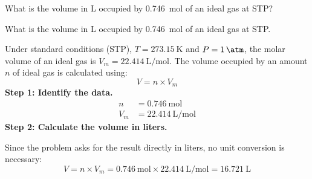 \begin{exercise}
    What is the volume in \unit{\liter} occupied by \qty{0.746}{\mol} of an ideal gas at STP?
    \begin{solu}
        What is the volume in \unit{\liter} occupied by \qty{0.746}{\mol} of an ideal gas at STP.


        Under standard conditions (STP), $T = \qty{273.15}{\kelvin}$ and $P = \qty{1}{\atm}$,
        the molar volume of an ideal gas is $V_m = \qty{22.414}{\liter\per\mol}$. The volume
        occupied by an amount $n$ of ideal gas is calculated using:
        \begin{equation*}
            V = n \times V_m
        \end{equation*}
        \textbf{Step 1: Identify the data.}
        \begin{align*}
            n   &= \qty{0.746}{\mol} \\
            V_m &= \qty{22.414}{\liter\per\mol}
        \end{align*}
        \textbf{Step 2: Calculate the volume in liters.}

        Since the problem asks for the result directly in liters, no unit conversion is
        necessary:
        \begin{equation*}
            V = n \times V_m = \qty{0.746}{\mol} \times \qty{22.414}{\liter\per\mol}
            = \boxed{\qty{16.721}{\liter}}
        \end{equation*}
    \end{solu}
\end{exercise}
